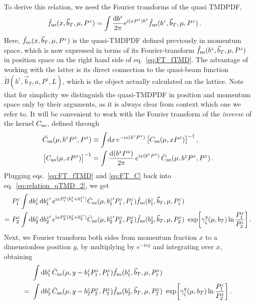 \documentclass[11pt,a4paper]{article}
\DeclareRobustCommand{\eq}[1]{eq.~\eqref{eq:#1}}
\DeclareRobustCommand{\eqs}[2]{eqs.~\eqref{eq:#1} and \eqref{eq:#2}}
\newcommand{\df}{\mathrm{d}}
\newcommand{\img}{\mathrm{i}}
\newcommand{\nn}{\nonumber}
\newcommand{\bt}{\vec b_T}
\newcommand{\ns}{{\rm ns}}
\begin{document}
To derive this relation, we need the Fourier transforms of the quasi TMDPDF,
\begin{align} \label{eq:FT_fTMD}
 \tilde f_\ns(x, \bt, \mu, P^z) &= \int\frac{\df b^z}{2\pi} e^{\img (x P^z) b^z} \tilde f_\ns(b^z, \bt, \mu, P^z)
\,.\end{align}
Here, $\tilde f_\ns(x, \bt, \mu, P^z)$ is the quasi-TMDPDF defined previously in momentum space,
which is now expressed in terms of its Fourier-transform $\tilde f_\ns(b^z, \bt, \mu, P^z)$ in position space
on the right hand side of \eq{FT_fTMD}. The advantage of working with the latter is its direct connection
to the quasi-beam function $\tilde B(b^z,\bt,a,P^z,L)$, which is the object actually calculated on the lattice.
Note that for simplicity we distinguish the quasi-TMDPDF in position and momentum space only by their arguments,
as it is always clear from context which one we refer to.
It will be convenient to work with the Fourier transform of the \emph{inverse} of the kernel $C_\ns$, defined through
\begin{align} \label{eq:FT_C}
 \bar C_\ns(\mu, b^z P^z, P^z) &\equiv \int\!\df x \, e^{-\img x (b^z P^z)} \, \bigl[ C_\ns(\mu, x P^z)\bigr]^{-1}
\,,\nn\\
 \bigl[ C_\ns(\mu, x P^z)\bigr]^{-1} &= \int\frac{\df (b^z P^z)}{2\pi} \, e^{\img x (b^z P^z)} \, \bar C_\ns(\mu, b^z P^z, P^z)
\,.
\end{align}
Plugging \eqs{FT_fTMD}{FT_C} back into \eq{relation_qTMD_2}, we get
\begin{align} \label{eq:relation_qTMD_3} 
&
 P^z_1 \int \df b^z_1 \, \df{b^z_1}' \, e^{\img x P^z_1 (b^z_1 + {b^z_1}')}
 \bar C_\ns(\mu, {b^z_1}' P^z_1, P^z_1) \tilde f_\ns(b^z_1, \bt, \mu, P^z_1)
 \\\nn
=~&
 P^z_2 \int \df b^z_2 \, \df{b^z_2}' \, e^{\img x P^z_2 (b^z_2 + {b^z_2}')}
 \bar C_\ns(\mu, {b^z_2}' P^z_2, P^z_2) \tilde f_\ns(b^z_2, \bt, \mu, P^z_2)
 \ \exp\biggl[ \gamma_\zeta^q(\mu, b_T) \ln\frac{P^z_1}{P^z_2} \biggr]
\,.\end{align}
Next, we Fourier transform both sides from momentum fraction $x$ to a dimensionless position $y$, by multiplying by $e^{-\img x y}$ and integrating over $x$, obtaining
\begin{align} \label{eq:relation_qTMD_4} 
 &
 \int \df b^z_1 \, \bar C_\ns(\mu, y - b^z_1 P^z_1, P^z_1) \tilde f_\ns(b^z_1, \bt, \mu, P^z_1)
 \\\nn
 =~&
 \int \df b^z_2 \, \bar C_\ns(\mu, y - b^z_2 P^z_2, P^z_2) \tilde f_\ns(b^z_2, \bt, \mu, P^z_2)
 \ \exp\biggl[ \gamma_\zeta^q(\mu, b_T) \ln\frac{P^z_1}{P^z_2} \biggr]
\,.\end{align}
\end{document}
